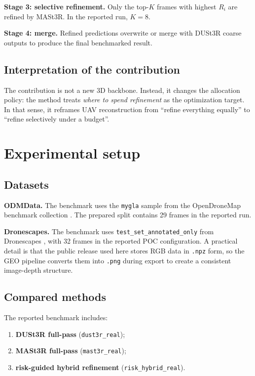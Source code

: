 \documentclass[preprint,12pt]{elsarticle}
\begin{document}
\textbf{Stage 3: selective refinement.}
Only the top-$K$ frames with highest $R_i$ are refined by MASt3R. In the reported run, $K=8$.

\textbf{Stage 4: merge.}
Refined predictions overwrite or merge with DUSt3R coarse outputs to produce the final benchmarked result.

\subsection{Interpretation of the contribution}

The contribution is not a new 3D backbone. Instead, it changes the allocation policy: the method treats \textit{where to spend refinement} as the optimization target. In that sense, it reframes UAV reconstruction from ``refine everything equally'' to ``refine selectively under a budget''.

\section{Experimental setup}

\subsection{Datasets}

\textbf{ODMData.}
The benchmark uses the \texttt{mygla} sample from the OpenDroneMap benchmark collection \citep{ODMDataBenchmarks}. The prepared split contains 29 frames in the reported run.

\textbf{Dronescapes.}
The benchmark uses \texttt{test\_set\_annotated\_only} from Dronescapes \citep{DronescapesDataset}, with 32 frames in the reported POC configuration. A practical detail is that the public release used here stores RGB data in \texttt{.npz} form, so the GEO pipeline converts them into \texttt{.png} during export to create a consistent image-depth structure.

\subsection{Compared methods}

The reported benchmark includes:
\begin{enumerate}[leftmargin=1.5em]
  \item \textbf{DUSt3R full-pass} (\texttt{dust3r\_real});
  \item \textbf{MASt3R full-pass} (\texttt{mast3r\_real});
  \item \textbf{risk-guided hybrid refinement} (\texttt{risk\_hybrid\_real}).
\end{enumerate}
\end{document}

